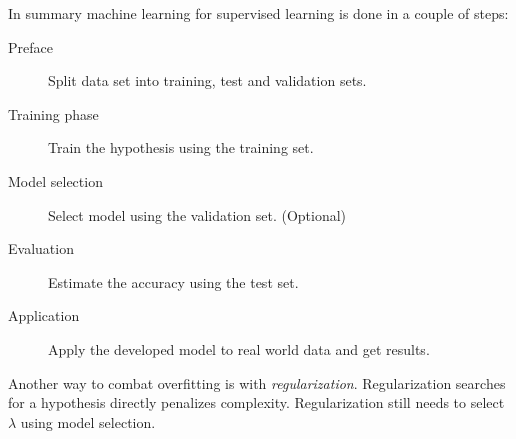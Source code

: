 In summary machine learning for supervised learning is done in a couple of steps:

\begin{description}
    \item[Preface] Split data set into training, test and validation sets.
    \item[Training phase] Train the hypothesis using the training set.
    \item[Model selection] Select model using the validation set. (Optional)
    \item[Evaluation] Estimate the accuracy using the test set.
    \item[Application] Apply the developed model to real world data and get results.
\end{description}

Another way to combat overfitting is with \textit{regularization}. Regularization searches for a hypothesis directly penalizes complexity.  Regularization still needs to select $\lambda$ using model selection.
\citep{norvigAI}
